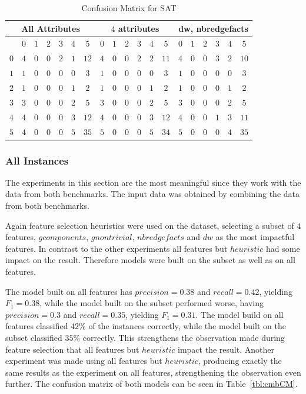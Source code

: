 \begin{table}[h]
	\center
	\begin{tabular}{|c|cccccc|cccccc|cccccc|}
		\hline\multicolumn{7}{|c|}{All Attributes} &\multicolumn{6}{|c|}{$4$ attributes}&\multicolumn{6}{|c|}{dw, nbredgefacts}\\
		\hline &$0$&$1$&$2$&$3$&$4$&$5$&$0$&$1$&$2$&$3$&$4$&$5$&$0$&$1$&$2$&$3$&$4$&$5$\\
		\hline $0$ & $4$ & $0$ & $0$ & $2$ & $1$ & $12$& $4$ & $0$ & $0$ & $2$ & $2$ & $11$& $4$ & $0$ & $0$ & $3$ & $2$ & $10$\\
					 $1$ & $1$ & $0$ & $0$ & $0$ & $0$ & $3$ & $1$ & $0$ & $0$ & $0$ & $0$ & $3$ & $1$ & $0$ & $0$ & $0$ & $0$ & $3$\\
					 $2$ & $1$ & $0$ & $0$ & $0$ & $1$ & $2$ & $1$ & $0$ & $0$ & $0$ & $1$ & $2$ & $1$ & $0$ & $0$ & $0$ & $1$ & $2$\\
					 $3$ & $3$ & $0$ & $0$ & $0$ & $2$ & $5$ & $3$ & $0$ & $0$ & $0$ & $2$ & $5$ & $3$ & $0$ & $0$ & $0$ & $2$ & $5$\\
					 $4$ & $4$ & $0$ & $0$ & $0$ & $3$ & $12$& $4$ & $0$ & $0$ & $0$ & $3$ & $12$& $4$ & $0$ & $0$ & $1$ & $3$ & $11$\\
					 $5$ & $4$ & $0$ & $0$ & $0$ & $5$ & $35$& $5$ & $0$ & $0$ & $0$ & $5$ & $34$& $5$ & $0$ & $0$ & $0$ & $4$ & $35$\\
		\hline
	\end{tabular}
	\caption{Confusion Matrix for SAT}
	\label{tbl:satCME1}
\end{table}
\subsubsection{All Instances}
The experiments in this section are the most meaningful since they work with the data from both benchmarks. The input data was obtained by combining the data from both benchmarks.

Again feature selection heuristics were used on the dataset, selecting a subset of $4$ features, $gcomponents$, $gnontrivial$, $nbredgefacts$ and $dw$ as the most impactful features. In contrast to the other experiments all features but $heuristic$ had some impact on the result. Therefore models were built on the subset as well as on all features.

The model built on all features has $precision=0.38$ and $recall=0.42$, yielding $F_1=0.38$, while the model built on the subset performed worse, having $precision=0.3$ and $recall=0.35$, yielding $F_1=0.31$. The model build on all features classified $42\%$ of the instances correctly, while the model built on the subset classified $35\%$ correctly. This strengthens the observation made during feature selection that all features but $heuristic$ impact the result. Another experiment was made using all features but $heuristic$, producing exactly the same results as the experiment on all features, strengthening the observation even further. The confusion matrix of both models can be seen in Table~\ref{tbl:cmbCM}.


